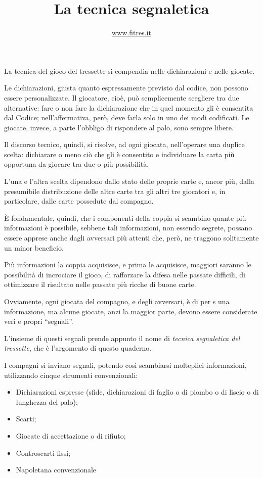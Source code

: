 \documentclass[italian,a4paper]{article}
\title{La tecnica segnaletica}
\author{\url{www.fitres.it}}
\date{}
\newenvironment{packeditem}{
\begin{itemize}
  \setlength{\itemsep}{1pt}
  \setlength{\parskip}{0pt}
  \setlength{\parsep}{0pt}
}{\end{itemize}}
\begin{document}
\maketitle
La tecnica del gioco del tressette si compendia nelle dichiarazioni e nelle
giocate.

Le dichiarazioni, giusta quanto espressamente previsto dal codice, non
possono essere personalizzate. Il giocatore, cioè,  può semplicemente
scegliere  tra due alternative: fare o non fare la dichiarazione che in quel
momento gli è consentita dal Codice; nell'affermativa, però, deve farla solo
in uno dei  modi codificati. Le giocate, invece, a parte l'obbligo di rispondere al palo, sono sempre
libere.

Il discorso tecnico, quindi, si risolve, ad ogni giocata, nell'operare una
duplice scelta: dichiarare o meno ciò che gli è consentito e individuare la
carta più opportuna da giocare tra due o più possibilità.

L'una e l'altra scelta dipendono dallo stato delle proprie carte e, ancor
più, dalla presumibile distribuzione delle altre carte tra gli altri tre
giocatori e, in particolare, dalle carte possedute dal compagno.

 \`E fondamentale, quindi, che i componenti della coppia si scambino quante
 più informazioni è possibile, sebbene tali informazioni, non essendo
 segrete, possano essere apprese anche dagli avversari più attenti che,
 però, ne traggono solitamente un minor beneficio.

 Più informazioni la coppia acquisisce, e prima le acquisisce, maggiori
 saranno le possibilità di incrociare il gioco, di rafforzare la difesa
 nelle passate difficili, di ottimizzare il risultato nelle passate più
 ricche di buone carte.

 Ovviamente, ogni giocata del compagno, e degli avversari, è di per s una
 informazione, ma alcune giocate, anzi la maggior parte, devono essere
 considerate veri e propri ``segnali''.

 L'insieme di questi segnali prende appunto il nome di \emph{tecnica segnaletica
 del tressette}, che è l'argomento di questo quaderno.

I compagni si inviano segnali, potendo così scambiarsi molteplici informazioni, utilizzando cinque strumenti convenzionali:
\begin{packeditem}
\item Dichiarazioni espresse (sfide, dichiarazioni di faglio o di piombo o di liscio o di lunghezza del palo);
\item Scarti;
\item Giocate di accettazione o di rifiuto;
\item Controscarti fissi;
\item Napoletana convenzionale
\end{packeditem}
 
\end{document}
